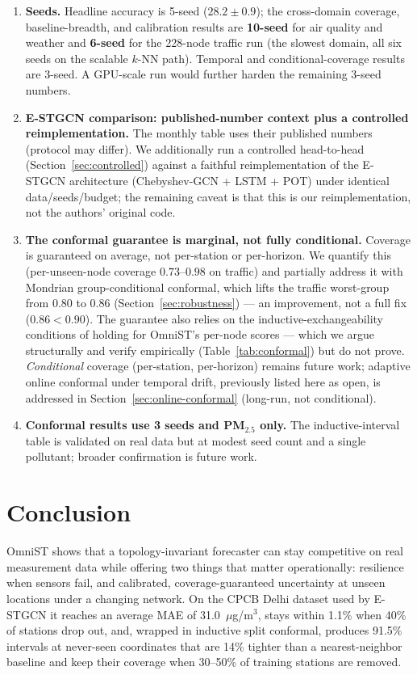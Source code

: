 \documentclass[journal]{IEEEtran}
\begin{document}
\begin{enumerate}
\item \textbf{Seeds.} Headline accuracy is 5-seed ($28.2\pm0.9$); the cross-domain coverage, baseline-breadth, and calibration results are \textbf{10-seed} for air quality and weather and \textbf{6-seed} for the 228-node traffic run (the slowest domain, all six seeds on the scalable $k$-NN path). Temporal and conditional-coverage results are 3-seed. A GPU-scale run would further harden the remaining 3-seed numbers.
\item \textbf{E-STGCN comparison: published-number context plus a controlled reimplementation.} The monthly table uses their published numbers (protocol may differ). We additionally run a controlled head-to-head (Section~\ref{sec:controlled}) against a faithful reimplementation of the E-STGCN architecture (Chebyshev-GCN + LSTM + POT) under identical data/seeds/budget; the remaining caveat is that this is our reimplementation, not the authors' original code.
\item \textbf{The conformal guarantee is marginal, not fully conditional.} Coverage is guaranteed on average, not per-station or per-horizon. We quantify this (per-unseen-node coverage $0.73$--$0.98$ on traffic) and partially address it with Mondrian group-conditional conformal, which lifts the traffic worst-group from $0.80$ to $0.86$ (Section~\ref{sec:robustness}) --- an improvement, not a full fix ($0.86 < 0.90$). The guarantee also relies on the inductive-exchangeability conditions of \cite{conformalinductivegnn2024} holding for OmniST's per-node scores --- which we argue structurally and verify empirically (Table~\ref{tab:conformal}) but do not prove. \emph{Conditional} coverage (per-station, per-horizon) remains future work; adaptive online conformal under temporal drift, previously listed here as open, is addressed in Section~\ref{sec:online-conformal} (long-run, not conditional).
\item \textbf{Conformal results use 3 seeds and PM$_{2.5}$ only.} The inductive-interval table is validated on real data but at modest seed count and a single pollutant; broader confirmation is future work.
\end{enumerate}

\section{Conclusion}
\label{sec:conclusion}

OmniST shows that a topology-invariant forecaster can stay competitive on real measurement data while
offering two things that matter operationally: resilience when sensors fail, and calibrated,
coverage-guaranteed uncertainty at unseen locations under a changing network. On the CPCB Delhi
dataset used by E-STGCN it reaches an average MAE of 31.0~$\mu$g/m$^3$, stays within 1.1\% when 40\% of
stations drop out, and, wrapped in inductive split conformal, produces 91.5\% intervals at never-seen
coordinates that are 14\% tighter than a nearest-neighbor baseline and keep their coverage when
30--50\% of training stations are removed.
\end{document}

